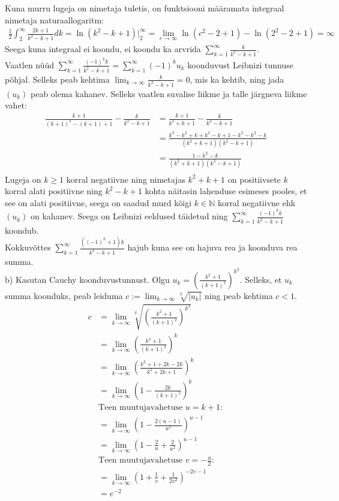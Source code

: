 \documentclass{article}
\begin{document}
Kuna murru lugeja on nimetaja tuletis, on funktsiooni m\"a\"aramata integraal nimetaja naturaallogaritm:
\begin{equation*}
\begin{aligned}
\frac{1}{2}\int_2^\infty\frac{2k+1}{k^2-k+1}dk=\ln(k^2-k+1)\Big|_2^\infty=\lim_{c\to\infty}\ln(c^2-2+1)-\ln(2^2-2+1)=\infty
\end{aligned}
\end{equation*}
Seega kuna integraal ei koondu, ei koondu ka arvrida $\sum_{k=1}^\infty\frac{k}{k^2-k+1}$.\\
Vaatlen n\"u\"ud $\sum_{k=1}^\infty\frac{(-1)^kk}{k^2-k+1}=\sum_{k=1}^\infty(-1)^ku_k$ koonduvust Leibnizi tunnuse p\~ohjal. Selleks peab kehtima $\lim_{k\to\infty}\frac{k}{k^2-k+1}=0$, mis ka kehtib, ning jada $(u_k)$ peab olema kahanev. Selleks vaatlen suvalise liikme ja talle j\"argneva liikme vahet:
\begin{equation*}
\begin{aligned}
\frac{k+1}{(k+1)^2-(k+1)+1}-\frac{k}{k^2-k+1}&=\frac{k+1}{k^2+k+1}-\frac{k}{k^2-k+1}\\
&=\frac{k^3-k^2+k+k^2-k+1-k^3-k^2-k}{(k^2+k+1)(k^2-k+1)}\\
&=\frac{1-k^2-k}{(k^2+k+1)(k^2-k+1)}\\
\end{aligned}
\end{equation*}
Lugeja on $k\geq1$ korral negatiivne ning nimetajas $k^2+k+1$ on positiivsete $k$ korral alati positiivne ning $k^2-k+1$ kohta n\"aitasin lahenduse esimeses pooles, et see on alati positiivne, seega on saadud murd k\~oigi $k\in\mathbb{N}$ korral negatiivne ehk $(u_k)$ on kahanev. Seega on Leibnizi eeldused t\"aidetud ning $\sum_{k=1}^\infty\frac{(-1)^kk}{k^2-k+1}$ koondub.\\
Kokkuv\~ottes $\sum_{k=1}^\infty\frac{((-1)^k+1)k}{k^2-k+1}$ hajub kuna see on hajuva rea ja koonduva rea summa.
\pagebreak\\
b) Kasutan Cauchy koonduvustunnust. Olgu $\displaystyle u_k=\left(\frac{k^2+1}{(k+1)^2}\right)^{k^2}$. Selleks, et $u_k$ summa koonduks, peab leiduma $c:=\lim_{k\to\infty}\sqrt[k]{|u_k|}$ ning peab kehtima $c<1$.
\begin{equation*}
\begin{aligned}
c&=\lim_{k\to\infty}\sqrt[k]{\left(\frac{k^2+1}{(k+1)^2}\right)^{k^2}}\\
&=\lim_{k\to\infty}\left(\frac{k^2+1}{(k+1)^2}\right)^{k}\\
&=\lim_{k\to\infty}\left(\frac{k^2+1+2k-2k}{k^2+2k+1}\right)^{k}\\
&=\lim_{k\to\infty}\left(1-\frac{2k}{(k+1)^2}\right)^{k}\\
&\text{Teen muutujavahetuse }u=k+1:\\
&=\lim_{k\to\infty}\left(1-\frac{2(u-1)}{u^2}\right)^{u-1}\\
&=\lim_{k\to\infty}\left(1-\frac{2}{u}+\frac{2}{u^2}\right)^{u-1}\\
&\text{Teen muutujavahetuse }v=-\frac{u}{2}:\\
&=\lim_{k\to\infty}\left(1+\frac{1}{v}+\frac{1}{2v^2}\right)^{-2v-1}\\
&=e^{-2}
\end{aligned}
\end{equation*}
\end{document}
